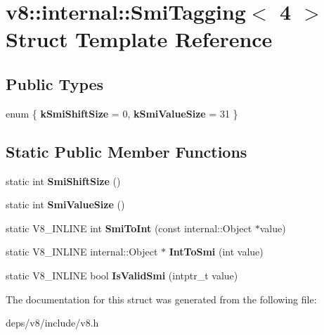 \hypertarget{structv8_1_1internal_1_1_smi_tagging_3_014_01_4}{}\section{v8\+:\+:internal\+:\+:Smi\+Tagging$<$ 4 $>$ Struct Template Reference}
\label{structv8_1_1internal_1_1_smi_tagging_3_014_01_4}
\subsection*{Public Types}
\begin{DoxyCompactItemize}
\item 
\hypertarget{structv8_1_1internal_1_1_smi_tagging_3_014_01_4_aa2b64cedd7f894f6964fe11746b029e4}{}enum \{ {\bfseries k\+Smi\+Shift\+Size} = 0, 
{\bfseries k\+Smi\+Value\+Size} = 31
 \}\label{structv8_1_1internal_1_1_smi_tagging_3_014_01_4_aa2b64cedd7f894f6964fe11746b029e4}

\end{DoxyCompactItemize}
\subsection*{Static Public Member Functions}
\begin{DoxyCompactItemize}
\item 
\hypertarget{structv8_1_1internal_1_1_smi_tagging_3_014_01_4_a6b4e44bb5de76851c70fb604e1a7a019}{}static int {\bfseries Smi\+Shift\+Size} ()\label{structv8_1_1internal_1_1_smi_tagging_3_014_01_4_a6b4e44bb5de76851c70fb604e1a7a019}

\item 
\hypertarget{structv8_1_1internal_1_1_smi_tagging_3_014_01_4_a07e9a8ef19de5cb4bba23cd9756d7b3e}{}static int {\bfseries Smi\+Value\+Size} ()\label{structv8_1_1internal_1_1_smi_tagging_3_014_01_4_a07e9a8ef19de5cb4bba23cd9756d7b3e}

\item 
\hypertarget{structv8_1_1internal_1_1_smi_tagging_3_014_01_4_a62bf3521541e99483c8d0743685dc375}{}static V8\+\_\+\+I\+N\+L\+I\+N\+E int {\bfseries Smi\+To\+Int} (const internal\+::\+Object $\ast$value)\label{structv8_1_1internal_1_1_smi_tagging_3_014_01_4_a62bf3521541e99483c8d0743685dc375}

\item 
\hypertarget{structv8_1_1internal_1_1_smi_tagging_3_014_01_4_abbc2788d901a590f3b9276e7e0d4059b}{}static V8\+\_\+\+I\+N\+L\+I\+N\+E internal\+::\+Object $\ast$ {\bfseries Int\+To\+Smi} (int value)\label{structv8_1_1internal_1_1_smi_tagging_3_014_01_4_abbc2788d901a590f3b9276e7e0d4059b}

\item 
\hypertarget{structv8_1_1internal_1_1_smi_tagging_3_014_01_4_a7ca3b3a7b14e2fbea5decac3675ac619}{}static V8\+\_\+\+I\+N\+L\+I\+N\+E bool {\bfseries Is\+Valid\+Smi} (intptr\+\_\+t value)\label{structv8_1_1internal_1_1_smi_tagging_3_014_01_4_a7ca3b3a7b14e2fbea5decac3675ac619}

\end{DoxyCompactItemize}


The documentation for this struct was generated from the following file\+:\begin{DoxyCompactItemize}
\item 
deps/v8/include/v8.\+h\end{DoxyCompactItemize}

